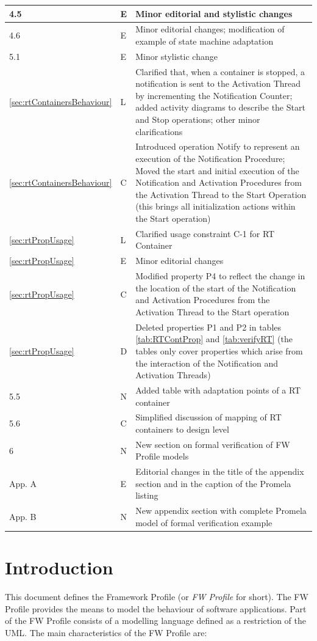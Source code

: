 \documentclass[definition]{../fwprofile}
\begin{document}
\begin{longtable}{|p{1.5cm}|p{1cm}|p{8cm}|}
\hline
4.5  & E & Minor editorial and stylistic changes \\
\hline
4.6  & E & Minor editorial changes; modification of example of state machine adaptation \\
\hline
5.1  & E & Minor stylistic change \\
\hline
\ref{sec:rtContainersBehaviour}  & L & Clarified that, when a container is stopped, a notification is sent to the Activation Thread by incrementing the Notification Counter; added activity diagrams to describe the Start and Stop operations; other minor clarifications\\
\hline
\ref{sec:rtContainersBehaviour}  & C & Introduced operation Notify to represent an execution of the Notification Procedure; Moved the start and initial execution of the Notification and Activation Procedures from the Activation Thread to the Start Operation (this brings all initialization actions within the Start operation) \\
\hline
\ref{sec:rtPropUsage} & L & Clarified usage constraint C-1 for RT Container\\
\hline
\ref{sec:rtPropUsage} & E & Minor editorial changes \\
\hline
\ref{sec:rtPropUsage} & C & Modified property P4 to reflect the change in the location of the start of the Notification and Activation Procedures from the Activation Thread to the Start operation \\
\hline
\ref{sec:rtPropUsage} & D & Deleted properties P1 and P2 in tables \ref{tab:RTContProp} and \ref{tab:verifyRT} (the tables only cover properties which arise from the interaction of the Notification and Activation Threads) \\
\hline
5.5 & N & Added table with adaptation points of a RT container \\
\hline
5.6 & C & Simplified discussion of mapping of RT containers to design level \\
\hline
6 & N & New section on formal verification of FW Profile models \\
\hline
App. A & E & Editorial changes in the title of the appendix section and in the caption of the Promela listing \\
\hline
App. B & N & New appendix section with complete Promela model of formal verification example \\
\hline
\end{longtable}

\section{Introduction}
This document defines the Framework Profile (or \textit{FW Profile} for short). The FW Profile 
provides the means to model the behaviour of software applications. Part of the FW
Profile consists of a modelling language defined as a restriction of the UML.
The main characteristics of the FW Profile are:
\end{document}
